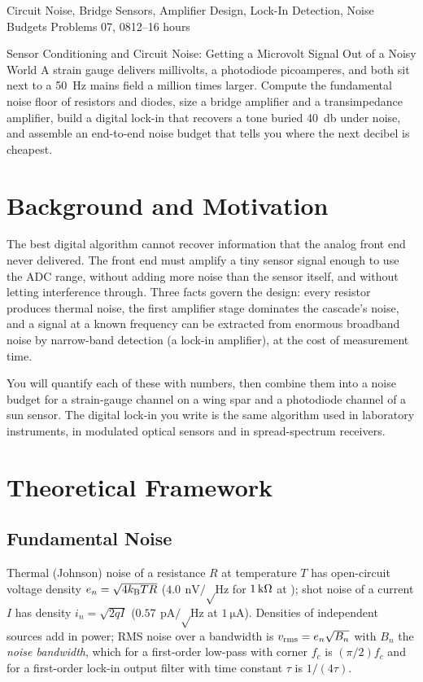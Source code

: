 \documentclass[11pt,a4paper]{article}
\begin{document}
%
{Circuit Noise, Bridge Sensors, Amplifier Design, Lock-In Detection, Noise Budgets}%
{Problems 07, 08}{12--16 hours}

\begin{summarybox}{Sensor Conditioning and Circuit Noise: Getting a Microvolt Signal Out of a Noisy World}
A strain gauge delivers millivolts, a photodiode picoamperes, and both sit next to a \SI{50}{\hertz} mains field a million times larger. Compute the fundamental noise floor of resistors and diodes, size a bridge amplifier and a transimpedance amplifier, build a digital lock-in that recovers a tone buried \SI{40}{\decibel} under noise, and assemble an end-to-end noise budget that tells you where the next decibel is cheapest.
\end{summarybox}


\section*{Background and Motivation}
The best digital algorithm cannot recover information that the analog front end never delivered. The front end must amplify a tiny sensor signal enough to use the ADC range, without adding more noise than the sensor itself, and without letting interference through. Three facts govern the design: every resistor produces thermal noise, the first amplifier stage dominates the cascade's noise, and a signal at a known frequency can be extracted from enormous broadband noise by narrow-band detection (a lock-in amplifier), at the cost of measurement time.

You will quantify each of these with numbers, then combine them into a noise budget for a strain-gauge channel on a wing spar and a photodiode channel of a sun sensor. The digital lock-in you write is the same algorithm used in laboratory instruments, in modulated optical sensors and in spread-spectrum receivers.

\section*{Theoretical Framework}
\subsection{Fundamental Noise}
Thermal (Johnson) noise of a resistance $R$ at temperature $T$ has open-circuit voltage density $e_n=\sqrt{4k_{\mathrm B} TR}$ ($\SI{4.0}{\nano\volt\per\sqrt\hertz}$ for $\SI{1}{\kilo\ohm}$ at ); shot noise of a current $I$ has density $i_n=\sqrt{2qI}$ ($\SI{0.57}{\pico\ampere\per\sqrt\hertz}$ at $\SI{1}{\micro\ampere}$). Densities of independent sources add in power; RMS noise over a bandwidth is $v_{\rm rms}=e_n\sqrt{B_n}$ with $B_n$ the \emph{noise bandwidth}, which for a first-order low-pass with corner $f_c$ is $(\pi/2)f_c$ and for a first-order lock-in output filter with time constant $\tau$ is $1/(4\tau)$.
\end{document}
